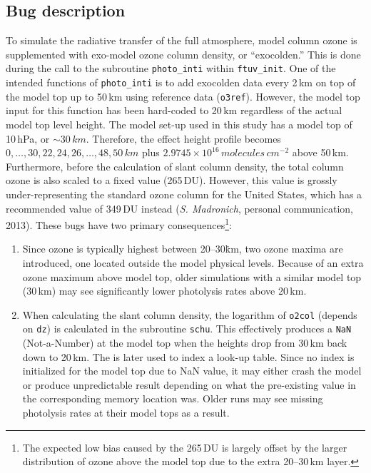 \subsection{Bug description}\label{a-ssec:bug/ftuv/bug}
	To simulate the radiative transfer of the full atmosphere, model column ozone is supplemented with exo-model ozone column density, or ``exocolden.'' This is done during the call to the subroutine \texttt{photo\_inti} within \texttt{ftuv\_init}. One of the intended functions of \texttt{photo\_inti} is to add exocolden data every 2\,\unit{km} on top of the model top up to 50\,\unit{km} using reference data (\texttt{o3ref}). However, the model top input for this function has been hard-coded to 20\,\unit{km} regardless of the actual model top level height. The model set-up used in this study has a model top of 10\,\unit{hPa}, or $\sim30\,\unit{km}$. Therefore, the effect height profile becomes $0,\ldots,30,22,24,26,\ldots,48,50\,\unit{km}$ plus $2.9745\times10^{16}\,\unit{molecules\,cm^{-2}}$ above 50\,\unit{km}. Furthermore, before the calculation of slant column density, the total column ozone is also scaled to a fixed value (265\,\unit{DU}). However, this value is grossly under-representing the standard ozone column for the United States, which has a recommended value of 349\,\unit{DU} instead (\textit{S. Madronich}, personal communication, 2013). These bugs have two primary consequences\footnote{The expected low bias caused by the 265\,\unit{DU} is largely offset by the larger distribution of ozone above the model top due to the extra 20--30\,\unit{km} layer.}:
	\begin{enumerate}
		\item Since ozone is typically highest between 20--30\.\unit{km}, two ozone maxima are introduced, one located outside the model physical levels. Because of an extra ozone maximum above model top, older simulations with a similar model top (30\,\unit{km}) may see significantly lower photolysis rates above 20\,\unit{km}.
		\item When calculating the slant column density, the logarithm of \texttt{o2col} (depends on \texttt{dz}) is calculated in the subroutine \texttt{schu}. This effectively produces a \texttt{NaN} (Not-a-Number) at the model top when the heights drop from 30\,\unit{km} back down to 20\,\unit{km}. The is later used to index a look-up table. Since no index is initialized for the model top due to NaN value, it may either crash the model or produce unpredictable result depending on what the pre-existing value in the corresponding memory location was. Older runs may see missing photolysis rates at their model tops as a result.
	\end{enumerate}

